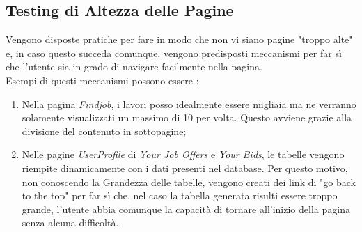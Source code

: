   \subsection{Testing di Altezza delle Pagine}
    Vengono disposte pratiche per fare in modo che non vi siano pagine "troppo alte" e, in caso questo succeda comunque, vengono predisposti meccanismi per far sì che l'utente sia in grado di navigare facilmente nella pagina. \\
    Esempi di questi meccanismi possono essere :
    \begin{enumerate}
      \item Nella pagina \textit{Findjob}, i lavori posso idealmente essere migliaia ma ne verranno solamente visualizzati un massimo di 10 per volta. Questo avviene grazie alla divisione del contenuto in sottopagine;
      \item Nelle pagine \textit{UserProfile} di \textit{Your Job Offers} e \textit{Your Bids}, le tabelle vengono riempite dinamicamente con i dati presenti nel database. Per questo motivo, non conoscendo la Grandezza
      delle tabelle, vengono creati dei link di "go back to the top" per far sì che, nel caso la tabella generata risulti essere troppo grande, l'utente abbia comunque la capacità di tornare all'inizio della pagina senza alcuna difficoltà.
    \end{enumerate}